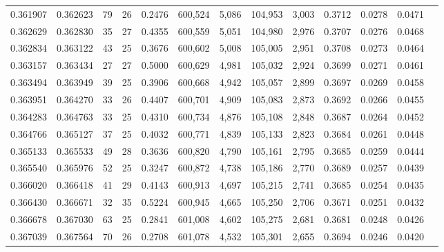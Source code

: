 \begin{tabular}{rrrrrrrrrrrrr}
0.361907 & 0.362623 &  79 &  26 &                                     0.2476 & 600,524 &   5,086 & 104,953 &   3,003 & 0.3712 & 0.0278 & 0.0471 \\
0.362629 & 0.362830 &  35 &  27 &                                     0.4355 & 600,559 &   5,051 & 104,980 &   2,976 & 0.3707 & 0.0276 & 0.0468 \\
0.362834 & 0.363122 &  43 &  25 &                                     0.3676 & 600,602 &   5,008 & 105,005 &   2,951 & 0.3708 & 0.0273 & 0.0464 \\
0.363157 & 0.363434 &  27 &  27 &                                     0.5000 & 600,629 &   4,981 & 105,032 &   2,924 & 0.3699 & 0.0271 & 0.0461 \\
0.363494 & 0.363949 &  39 &  25 &                                     0.3906 & 600,668 &   4,942 & 105,057 &   2,899 & 0.3697 & 0.0269 & 0.0458 \\
0.363951 & 0.364270 &  33 &  26 &                                     0.4407 & 600,701 &   4,909 & 105,083 &   2,873 & 0.3692 & 0.0266 & 0.0455 \\
0.364283 & 0.364763 &  33 &  25 &                                     0.4310 & 600,734 &   4,876 & 105,108 &   2,848 & 0.3687 & 0.0264 & 0.0452 \\
0.364766 & 0.365127 &  37 &  25 &                                     0.4032 & 600,771 &   4,839 & 105,133 &   2,823 & 0.3684 & 0.0261 & 0.0448 \\
0.365133 & 0.365533 &  49 &  28 &                                     0.3636 & 600,820 &   4,790 & 105,161 &   2,795 & 0.3685 & 0.0259 & 0.0444 \\
0.365540 & 0.365976 &  52 &  25 &                                     0.3247 & 600,872 &   4,738 & 105,186 &   2,770 & 0.3689 & 0.0257 & 0.0439 \\
0.366020 & 0.366418 &  41 &  29 &                                     0.4143 & 600,913 &   4,697 & 105,215 &   2,741 & 0.3685 & 0.0254 & 0.0435 \\
0.366430 & 0.366671 &  32 &  35 &                                     0.5224 & 600,945 &   4,665 & 105,250 &   2,706 & 0.3671 & 0.0251 & 0.0432 \\
0.366678 & 0.367030 &  63 &  25 &                                     0.2841 & 601,008 &   4,602 & 105,275 &   2,681 & 0.3681 & 0.0248 & 0.0426 \\
0.367039 & 0.367564 &  70 &  26 &                                     0.2708 & 601,078 &   4,532 & 105,301 &   2,655 & 0.3694 & 0.0246 & 0.0420 \\

\end{tabular}
